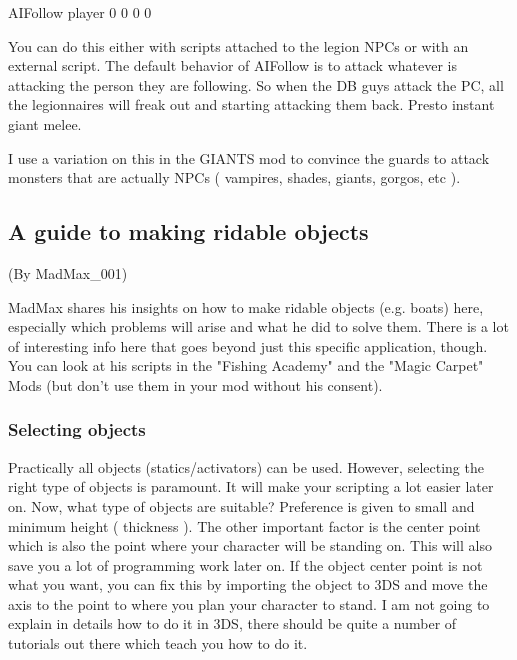 AIFollow player 0 0 0 0

You can do this either with scripts attached to the legion NPCs or with
an external script. The default behavior of AIFollow is to attack
whatever is attacking the person they are following. So when the DB guys
attack the PC, all the legionnaires will freak out and starting
attacking them back. Presto instant giant melee.

I use a variation on this in the GIANTS mod to convince the guards to
attack monsters that are actually NPCs ( vampires, shades, giants,
gorgos, etc ).

\hypertarget{a-guide-to-making-ridable-objects}{%
\subsection{\texorpdfstring{\hfill\break
A guide to making ridable
objects}{ A guide to making ridable objects}}\label{a-guide-to-making-ridable-objects}}

(By MadMax\_001)

MadMax shares his insights on how to make ridable objects (e.g. boats)
here, especially which problems will arise and what he did to solve
them. There is a lot of interesting info here that goes beyond just this
specific application, though. You can look at his scripts in the
"Fishing Academy" and the "Magic Carpet" Mods (but don't use them in
your mod without his consent).

\hypertarget{selecting-objects}{%
\subsubsection{\texorpdfstring{Selecting objects
}{Selecting objects }}\label{selecting-objects}}

Practically all objects (statics/activators) can be used. However,
selecting the right type of objects is paramount. It will make your
scripting a lot easier later on. Now, what type of objects are suitable?
Preference is given to small and minimum height ( thickness ). The other
important factor is the center point which is also the point where your
character will be standing on. This will also save you a lot of
programming work later on. If the object center point is not what you
want, you can fix this by importing the object to 3DS and move the axis
to the point to where you plan your character to stand. I am not going
to explain in details how to do it in 3DS, there should be quite a
number of tutorials out there which teach you how to do it.

